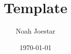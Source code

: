 \documentclass[11pt, a4paper, twocolumn]{article}
\begin{document}
\title{Template}
\author{Noah Joestar}
\date{\today}
\maketitle
\thispagestyle{fancy}
\end{document}
